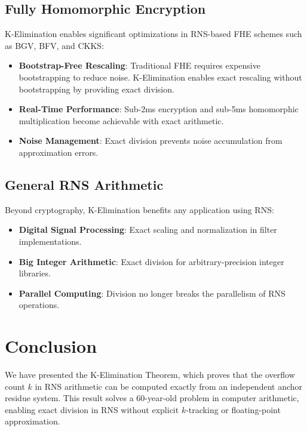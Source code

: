 \documentclass[11pt,a4paper]{article}
\begin{document}
\subsection{Fully Homomorphic Encryption}

K-Elimination enables significant optimizations in RNS-based FHE schemes such as BGV, BFV, and CKKS:

\begin{itemize}[noitemsep]
    \item \textbf{Bootstrap-Free Rescaling}: Traditional FHE requires expensive bootstrapping to reduce noise. K-Elimination enables exact rescaling without bootstrapping by providing exact division.
    \item \textbf{Real-Time Performance}: Sub-2ms encryption and sub-5ms homomorphic multiplication become achievable with exact arithmetic.
    \item \textbf{Noise Management}: Exact division prevents noise accumulation from approximation errors.
\end{itemize}

\subsection{General RNS Arithmetic}

Beyond cryptography, K-Elimination benefits any application using RNS:

\begin{itemize}[noitemsep]
    \item \textbf{Digital Signal Processing}: Exact scaling and normalization in filter implementations.
    \item \textbf{Big Integer Arithmetic}: Exact division for arbitrary-precision integer libraries.
    \item \textbf{Parallel Computing}: Division no longer breaks the parallelism of RNS operations.
\end{itemize}

\section{Conclusion}

We have presented the K-Elimination Theorem, which proves that the overflow count $k$ in RNS arithmetic can be computed exactly from an independent anchor residue system. This result solves a 60-year-old problem in computer arithmetic, enabling exact division in RNS without explicit $k$-tracking or floating-point approximation.
\end{document}
